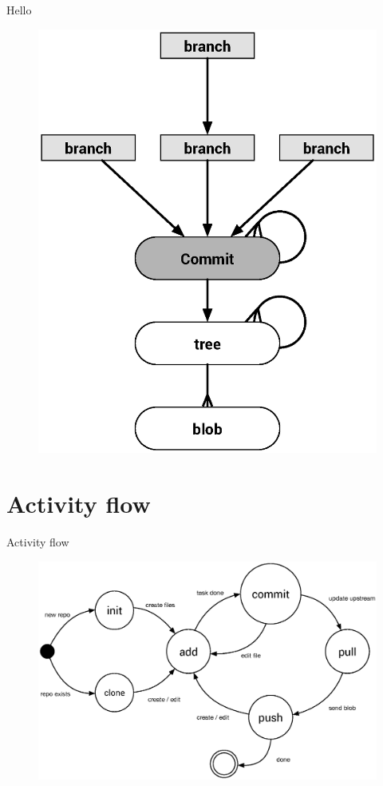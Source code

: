 \documentclass{beamer}
\begin{document}
\begin{frame}{Hello}
    \begin{figure}
        \center
        \includegraphics[height=.8\textheight]{git-action}
        \label{fig:git-action}
    \end{figure}
\end{frame}

\section{Activity flow}
\begin{frame}{Activity flow}
    \begin{figure}
        \center
        \includegraphics[width=.9\textwidth]{git-command-flow}
        \label{fig:git-command-flow}
    \end{figure}
\end{frame}
\end{document}
